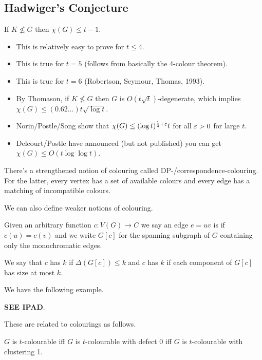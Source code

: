 \documentclass[main.tex]{subfiles}
\begin{document}
\subsection{Hadwiger's Conjecture}%
\begin{conjecture}
  If $K\not\leq G$ then $\chi(G)\leq t-1$.
\end{conjecture}
\begin{itemize}
  \item This is relatively easy to prove for $t\leq 4$.
  \item This is true for $t = 5$ (follows from basically the 4-colour theorem).
  \item This is true for $t = 6$ (Robertson, Seymour, Thomas, 1993).
  \item By Thomason, if $K\not\leq G$ then $G$ is $O(t\sqrt t)$-degenerate,
    which implies $\chi(G)\leq(0.62\ldots)t\sqrt{\log t}$.
  \item Norin/Postle/Song show that $\chi(G)\leq(\log t)^{\frac 1 4 + \varepsilon} t$
    for all $\varepsilon > 0$ for large $t$.
  \item Delcourt/Postle have announced (but not published) you can get
    $\chi(G)\leq O(t\log\log t)$.
\end{itemize}
\begin{remark*}
  There's a strengthened notion of colouring called DP-/correspondence-colouring.
  For the latter, every vertex has a set of available colours and every edge
  has a matching of incompatible colours.
\end{remark*}
We can also define weaker notions of colouring.
\begin{definition*}
  Given an arbitrary function $c:V(G)\to C$ we say an edge $e = uv$ is
   if $c(u) = c(v)$ and we write $G[c]$ for the spanning
  subgraph of $G$ containing only the monochromatic edges.

  We say that $c$ has  $k$ if $\Delta(G[c])\leq k$ and $c$ has
   $k$ if each component of $G[c]$ has size at most $k$.
\end{definition*}
We have the following example.
\begin{example*}
  \textbf{SEE IPAD}.
\end{example*}
These are related to colourings as follows.
\begin{note*}
  $G$ is $t$-colourable iff $G$ is $t$-colourable with defect 0 iff $G$ is
  $t$-colourable with clustering 1.
\end{note*}
\end{document}

